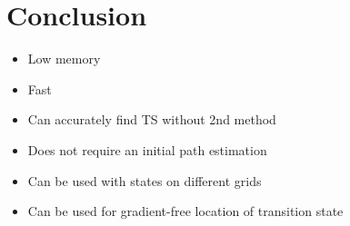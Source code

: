 \documentclass[aps,twocolumn]{revtex4}
\begin{document}
\section{Conclusion}
\begin{itemize}
\item
Low memory
\item
Fast
\item
Can accurately find TS without 2nd method
\item
Does not require an initial path estimation
\item
Can be used with states on different grids
\item
Can be used for gradient-free location of transition state
\end{itemize}




\end{document}
